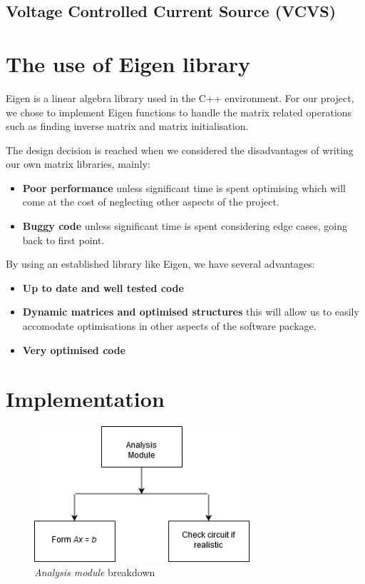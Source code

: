 \documentclass[a4paper, titlepage]{article}
\begin{document}
    \subsection{Voltage Controlled Current Source (VCVS)}
    \pagebreak

    \section{The use of Eigen library}
    Eigen is a linear algebra library used in the C++ environment. For our project, we chose to implement 
    Eigen functions to handle the matrix related operations such as finding inverse matrix 
    and matrix initialisation.
    \par
    The design decision is reached when we considered
    the disadvantages of writing our own matrix libraries, mainly:
    \begin{itemize}
        \item \textbf{Poor performance} unless significant time is spent optimising which will come at the cost of
        neglecting other aspects of the project.
        \item \textbf{Buggy code} unless significant time is spent considering edge cases, going back to first point.
    \end{itemize}
    By using an established library like Eigen, we have several advantages:
    \begin{itemize}
        \item \textbf{Up to date and well tested code}
        \item \textbf{Dynamic matrices and optimised structures} this will allow us to easily accomodate  
        optimisations in other aspects of the software package.
        \item \textbf{Very optimised code}

    \end{itemize}
    \pagebreak

    \section{Implementation}
    \begin{figure}[htp]
        \centering
        \includegraphics[width=80mm,scale=1]{Analysis breakdown}
        \caption{\textit{Analysis module} breakdown}
        \label{fig:figure3}
    \end{figure}
\end{document}
